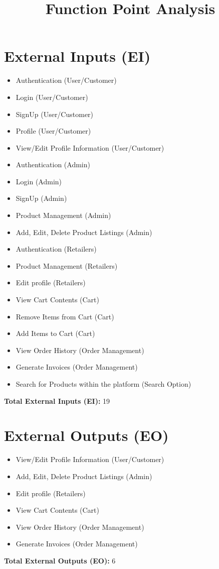 \documentclass{article}
\title{Function Point Analysis}
\date{}
\begin{document}
\maketitle

\section*{External Inputs (EI)}
\begin{itemize}[leftmargin=*]
    \item Authentication (User/Customer)
    \item Login (User/Customer)
    \item SignUp (User/Customer)
    \item Profile (User/Customer)
    \item View/Edit Profile Information (User/Customer)
    \item Authentication (Admin)
    \item Login (Admin)
    \item SignUp (Admin)
    \item Product Management (Admin)
    \item Add, Edit, Delete Product Listings (Admin)
    \item Authentication (Retailers)
    \item Product Management (Retailers)
    \item Edit profile (Retailers)
    \item View Cart Contents (Cart)
    \item Remove Items from Cart (Cart)
    \item Add Items to Cart (Cart)
    \item View Order History (Order Management)
    \item Generate Invoices (Order Management)
    \item Search for Products within the platform (Search Option)
\end{itemize}
\textbf{Total External Inputs (EI):} 19

\section*{External Outputs (EO)}
\begin{itemize}[leftmargin=*]
    \item View/Edit Profile Information (User/Customer)
    \item Add, Edit, Delete Product Listings (Admin)
    \item Edit profile (Retailers)
    \item View Cart Contents (Cart)
    \item View Order History (Order Management)
    \item Generate Invoices (Order Management)
\end{itemize}
\textbf{Total External Outputs (EO):} 6
\end{document}
